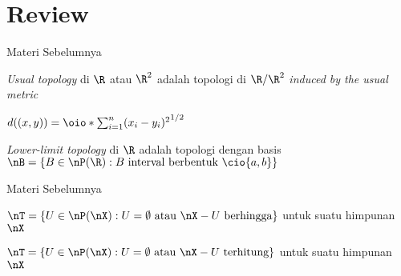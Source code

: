 \section{Review}

\begin{frame}{Materi Sebelumnya}
    \begin{tcolorbox}[enhanced,title=Usual Topology, frame style tile={width=\paperwidth}{\wallpaper}]
        \textit{Usual topology} di $\R$ atau $\R^2$ adalah topologi di $\R/\R^2$ 
        \textit{induced by the usual metric}
    \end{tcolorbox}
    \begin{tcolorbox}[enhanced,title=Usual Metric di $\R^n$, frame style tile={width=\paperwidth}{\wallpaper}]
        $d((x,y)) = \oio*{\sum_{i=1}^n(x_i-y_i)^{2}}^{1/2}$
    \end{tcolorbox}
    \begin{tcolorbox}[enhanced,title=Lower-limit Topology, frame style tile={width=\paperwidth}{\wallpaper}]
        \textit{Lower-limit topology} di $\R$ adalah topologi dengan basis
        $\nB = \{B\in \nP(\R): B\text{ interval berbentuk } \cio{a,b}\}$
    \end{tcolorbox}
\end{frame}

\begin{frame}{Materi Sebelumnya}
    \begin{tcolorbox}[enhanced,title=Finite Complement Topology, frame style tile={width=\paperwidth}{\wallpaper}]
        $\nT = \{ U \in \nP(\nX): U = \emptyset \text{ atau } \nX-U \text{ berhingga}\}$ untuk suatu himpunan $\nX$
    \end{tcolorbox}
    \begin{tcolorbox}[enhanced,title=Countable Complement Topology, frame style tile={width=\paperwidth}{\wallpaper}]
        $\nT = \{ U \in \nP(\nX): U = \emptyset \text{ atau } \nX-U \text{ terhitung}\}$ untuk suatu himpunan $\nX$
    \end{tcolorbox}
\end{frame}
